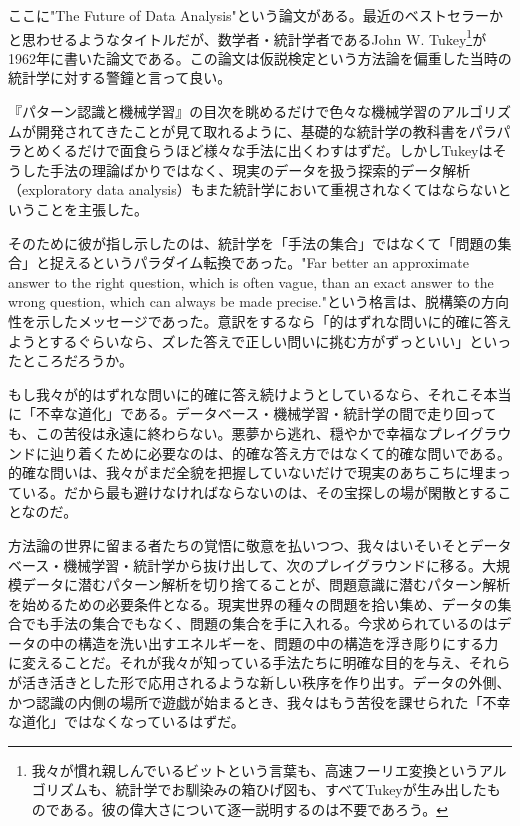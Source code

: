ここに"The Future of Data Analysis"という論文がある。最近のベストセラーかと思わせるようなタイトルだが、数学者・統計学者であるJohn W. Tukey\footnote{我々が慣れ親しんでいるビットという言葉も、高速フーリエ変換というアルゴリズムも、統計学でお馴染みの箱ひげ図も、すべてTukeyが生み出したものである。彼の偉大さについて逐一説明するのは不要であろう。}が1962年に書いた論文である。この論文は仮説検定という方法論を偏重した当時の統計学に対する警鐘と言って良い。

『パターン認識と機械学習』の目次を眺めるだけで色々な機械学習のアルゴリズムが開発されてきたことが見て取れるように、基礎的な統計学の教科書をパラパラとめくるだけで面食らうほど様々な手法に出くわすはずだ。しかしTukeyはそうした手法の理論ばかりではなく、現実のデータを扱う探索的データ解析（exploratory data analysis）もまた統計学において重視されなくてはならないということを主張した。

そのために彼が指し示したのは、統計学を「手法の集合」ではなくて「問題の集合」と捉えるというパラダイム転換であった。"Far better an approximate answer to the right question, which is often vague, than an exact answer to the wrong question, which can always be made precise."という格言は、脱構築の方向性を示したメッセージであった。意訳をするなら「的はずれな問いに的確に答えようとするぐらいなら、ズレた答えで正しい問いに挑む方がずっといい」といったところだろうか。

もし我々が的はずれな問いに的確に答え続けようとしているなら、それこそ本当に「不幸な道化」である。データベース・機械学習・統計学の間で走り回っても、この苦役は永遠に終わらない。悪夢から逃れ、穏やかで幸福なプレイグラウンドに辿り着くために必要なのは、的確な答え方ではなくて的確な問いである。的確な問いは、我々がまだ全貌を把握していないだけで現実のあちこちに埋まっている。だから最も避けなければならないのは、その宝探しの場が閑散とすることなのだ。

方法論の世界に留まる者たちの覚悟に敬意を払いつつ、我々はいそいそとデータベース・機械学習・統計学から抜け出して、次のプレイグラウンドに移る。大規模データに潜むパターン解析を切り捨てることが、問題意識に潜むパターン解析を始めるための必要条件となる。現実世界の種々の問題を拾い集め、データの集合でも手法の集合でもなく、問題の集合を手に入れる。今求められているのはデータの中の構造を洗い出すエネルギーを、問題の中の構造を浮き彫りにする力に変えることだ。それが我々が知っている手法たちに明確な目的を与え、それらが活き活きとした形で応用されるような新しい秩序を作り出す。データの外側、かつ認識の内側の場所で遊戯が始まるとき、我々はもう苦役を課せられた「不幸な道化」ではなくなっているはずだ。

